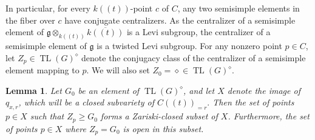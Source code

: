\documentclass[12pt]{article}
\DeclareMathOperator{\TL}{TL}
\newtheorem{lemma}[theorem]{Lemma}
\theoremstyle{remark}
\begin{document}
In particular, for every $k((t))$-point $c$ of $C$, any two semisimple elements in the fiber over $c$ have conjugate centralizers. As the centralizer of a semisimple element of $\mathfrak{g}\otimes_{k((t))}\overline{k((t))}$ is a Levi subgroup, the centralizer of a semisimple element of $\mathfrak{g}$ is a twisted Levi subgroup. For any nonzero point $p\in C$, let $Z_p\in\TL(G)^{\diamond}$ denote the conjugacy class of the centralizer of a semisimple element mapping to $p$. We will also set $Z_0={\diamond}\in\TL(G)^{\diamond}.$

\begin{lemma}\label{semicontinuity}
Let $G_0$ be an element of $\TL(G)^{\diamond}$, and let $X$ denote the image of $q_{x,r}$, which will be a closed subvariety of $C((t))_{=r}.$ Then the set of points $p\in X$ such that $Z_p\geq G_0$ forms a Zariski-closed subset of $X$. Furthermore, the set of points $p\in X$ where $Z_p=G_0$ is open in this subset.
\end{lemma}
\end{document}
